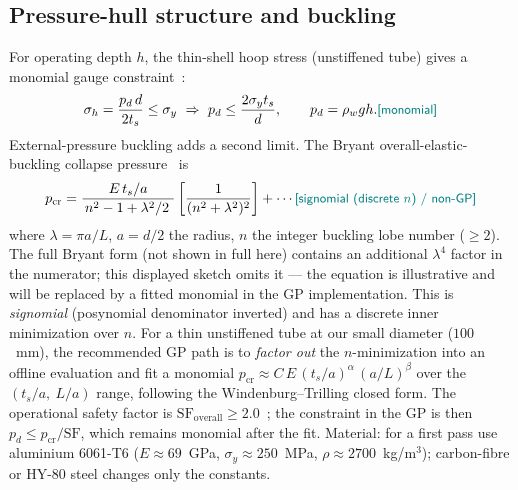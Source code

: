 \documentclass[conf]{new-aiaa}
\newcommand{\gpc}[1]{\textcolor{teal}{\small\textsf{[#1]}}} %
\begin{document}
\subsection{Pressure-hull structure and buckling}\label{sec:structure}
For operating depth $h$, the thin-shell hoop stress (unstiffened tube) gives a monomial gauge
constraint~\cite{shinoka2024structural}:
\begin{equation}
\sigma_h = \frac{p_d\, d}{2 t_s} \le \sigma_y \ \Rightarrow\
p_d \le \frac{2\sigma_y t_s}{d},
\qquad p_d = \rho_w g h. \gpc{monomial}
\end{equation}
External-pressure buckling adds a second limit. The Bryant overall-elastic-buckling collapse
pressure~\cite{shinoka2024structural} is
\begin{equation}
p_{\text{cr}} = \frac{E\,t_s/a}{\,n^2-1+\lambda^2/2\ }
                \left[\frac{1}{(n^2+ \lambda^2)^2}\right] + \cdots
                \gpc{signomial (discrete $n$) / non-GP}
\end{equation}
where $\lambda=\pi a/L$, $a=d/2$ the radius, $n$ the integer buckling lobe number ($\ge2$).
The full Bryant form (not shown in full here) contains an additional $\lambda^4$ factor in the
numerator; this displayed sketch omits it — the equation is illustrative and will be replaced by a
fitted monomial in the GP implementation.
This is \emph{signomial} (posynomial denominator inverted) and has a discrete inner minimization over
$n$. For a thin unstiffened tube at our small diameter ($100$~mm), the recommended GP path is to
\emph{factor out} the $n$-minimization into an offline evaluation and fit a monomial
$p_{\text{cr}} \approx C\,E\,(t_s/a)^\alpha\,(a/L)^\beta$ over the $(t_s/a,\ L/a)$ range,
following the Windenburg--Trilling closed form. The operational safety factor is
$\mathrm{SF}_{\text{overall}}\ge2.0$~\cite{shinoka2024structural}; the constraint in the GP is
then $p_d \le p_{\text{cr}}/\mathrm{SF}$, which remains monomial after the fit.
Material: for a first pass use aluminium 6061-T6 ($E\approx69$~GPa, $\sigma_y\approx 250$~MPa,
$\rho\approx2700$~kg/m$^3$); carbon-fibre or HY-80 steel changes only the constants.
\end{document}
